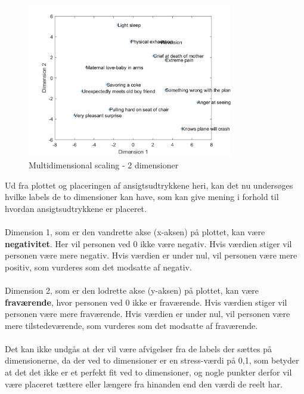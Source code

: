 \begin{figure}[H]
\centering
\includegraphics[width = 0.8\textwidth]{Figure/multidimensional.png} 
\caption{Multidimensional scaling - 2 dimensioner}
\label{fig:MDS}
\end{figure}

\noindent Ud fra plottet og placeringen af ansigtsudtrykkene heri, kan det nu undersøges hvilke labels de to dimensioner kan have, som kan give mening i forhold til hvordan ansigtsudtrykkene er placeret. 
\\\\
Dimension 1, som er den vandrette akse (x-aksen) på plottet, kan være \textbf{negativitet}. Her vil personen ved 0 ikke være negativ. Hvis værdien stiger vil personen være mere negativ. Hvis værdien er under nul, vil personen være mere positiv, som vurderes som det modsatte af negativ. 
\\\\
Dimension 2, som er den lodrette akse (y-aksen) på plottet, kan være \textbf{fraværende}, hvor personen ved 0 ikke er fraværende. Hvis værdien stiger vil personen være mere fraværende. Hvis værdien er under nul, vil personen være mere tilstedeværende, som vurderes som det modsatte af fraværende. 
\\\\
Det kan ikke undgås at der vil være afvigelser fra de labels der sættes på dimensionerne, da der ved to dimensioner er en stress-værdi på 0,1, som betyder at det det ikke er et perfekt fit ved to dimensioner, og nogle punkter derfor vil være placeret tættere eller længere fra hinanden end den værdi de reelt har.